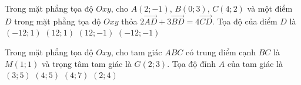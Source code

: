 \begin{ex}%
	Trong mặt phẳng tọa độ $Oxy$, cho $A(2; -1)$, $B(0; 3)$, $C(4; 2)$ và một điểm $D$ trong mặt phẳng tọa độ $Oxy$ thỏa $2\vec{AD} + 3\vec{BD} = 4\vec{CD}$. Tọa độ của điểm $D$ là
	\choice
	{$(-12; 1)$}
	{$(12; 1)$}
	{$(12; -1)$}
	{\True $(-12; -1)$}
\end{ex}
\begin{ex}%
	Trong mặt phẳng tọa độ $Oxy$, cho tam giác $ABC$ có trung điểm cạnh $BC$ là $M(1; 1)$ và trọng tâm tam giác là $G(2; 3)$. Tọa độ đỉnh $A$ của tam giác là
	\choice
	{$(3; 5)$}
	{$(4; 5)$}
	{\True $(4; 7)$}
	{$(2; 4)$}
\end{ex}

